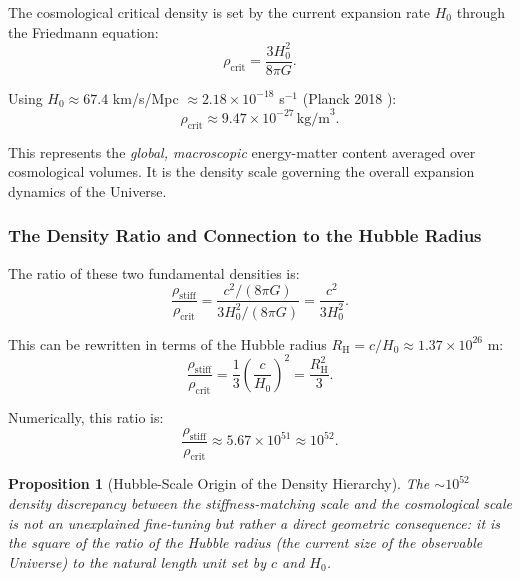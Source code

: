 \documentclass[11pt,a4paper]{article}
\newcommand{\rhocrit}{\rho_{\mathrm{crit}}}
\newcommand{\rhostiff}{\rho_{\mathrm{stiff}}}
\newcommand{\RH}{R_{\mathrm{H}}}
\newtheorem{proposition}{Proposition}
\theoremstyle{definition}
\begin{document}
The cosmological critical density is set by the current expansion rate $H_0$ through the Friedmann equation:
\begin{equation}
\label{eq:rho_crit}
\rhocrit = \frac{3H_0^2}{8\pi G}.
\end{equation}

Using $H_0 \approx 67.4$ km/s/Mpc $\approx 2.18 \times 10^{-18}$ s$^{-1}$ (Planck 2018 \cite{Planck2018}):
\begin{equation}
\label{eq:rho_crit_value}
\rhocrit \approx 9.47 \times 10^{-27} \, \text{kg/m}^3.
\end{equation}

This represents the \emph{global, macroscopic} energy-matter content averaged over cosmological volumes. It is the density scale governing the overall expansion dynamics of the Universe.

\subsubsection{The Density Ratio and Connection to the Hubble Radius}
\label{sec:density_ratio}

The ratio of these two fundamental densities is:
\begin{equation}
\label{eq:density_ratio_raw}
\frac{\rhostiff}{\rhocrit} = \frac{c^2/(8\pi G)}{3H_0^2/(8\pi G)} = \frac{c^2}{3H_0^2}.
\end{equation}

This can be rewritten in terms of the Hubble radius $\RH = c/H_0 \approx 1.37 \times 10^{26}$ m:
\begin{equation}
\label{eq:density_ratio_hubble}
\boxed{\frac{\rhostiff}{\rhocrit} = \frac{1}{3}\left(\frac{c}{H_0}\right)^2 = \frac{\RH^2}{3}.}
\end{equation}

Numerically, this ratio is:
\begin{equation}
\label{eq:density_ratio_value}
\frac{\rhostiff}{\rhocrit} \approx 5.67 \times 10^{51} \approx 10^{52}.
\end{equation}

\begin{proposition}[Hubble-Scale Origin of the Density Hierarchy]
\label{prop:hubble_hierarchy}
The $\sim 10^{52}$ density discrepancy between the stiffness-matching scale and the cosmological scale is not an unexplained fine-tuning but rather a direct geometric consequence: it is the square of the ratio of the Hubble radius (the current size of the observable Universe) to the natural length unit set by $c$ and $H_0$.
\end{proposition}
\end{document}
